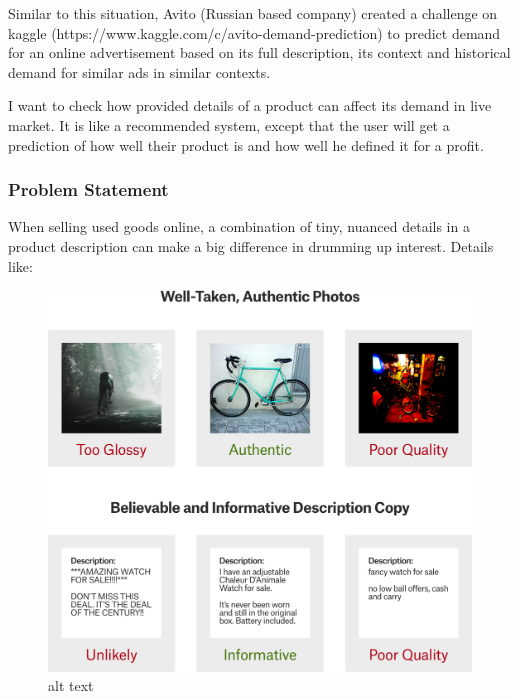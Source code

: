 \documentclass[11pt]{article}
\makeatletter
\def\maxwidth{\ifdim\Gin@nat@width>\linewidth\linewidth
    \else\Gin@nat@width\fi}
\let\Oldincludegraphics\includegraphics
\renewcommand{\includegraphics}[1]{\Oldincludegraphics[width=.8\maxwidth]{#1}}
\makeatother
\begin{document}
Similar to this situation, Avito (Russian based company) created a
challenge on kaggle (https://www.kaggle.com/c/avito-demand-prediction)
to predict demand for an online advertisement based on its full
description, its context and historical demand for similar ads in
similar contexts.

I want to check how provided details of a product can affect its demand
in live market. It is like a recommended system, except that the user
will get a prediction of how well their product is and how well he
defined it for a profit.

    \hypertarget{problem-statement}{%
\subsubsection{Problem Statement}\label{problem-statement}}

    When selling used goods online, a combination of tiny, nuanced details
in a product description can make a big difference in drumming up
interest. Details like:

\begin{figure}
\centering
\includegraphics{./statement.png}
\caption{alt text}
\end{figure}
\end{document}
